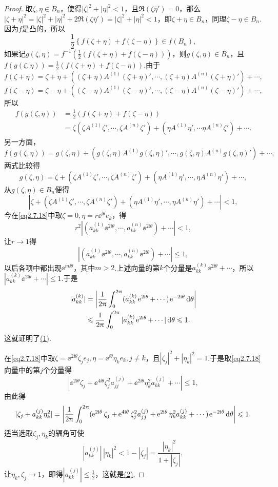 \begin{proof}
	取$\zeta,\eta\in B_n$，使得$|\zeta|^2+|\eta|^2<1$，且$\Re(\zeta\bar{\eta}')=0$，那么$|\zeta+\eta|^2=|\zeta|^2+|\eta|^2+2\Re(\zeta\bar{\eta}')=|\zeta|^2+|\eta|^2<1$，即$\zeta+\eta\in B_n$，同理$\zeta-\eta\in B_n$.因为$f$是凸的，所以
	\[\frac12\left\{f(\zeta+\eta)+f(\zeta-\eta)\right\}\in f(B_n),\]
	如果记$g(\zeta,\eta)=f^{-1}\left(\frac12\left(f(\zeta+\eta)+f(\zeta-\eta)\right)\right)$，则$g(\zeta,\eta)\in B_n$，且$f(g(\zeta,\eta))=\frac12\left(f(\zeta+\eta)+f(\zeta-\eta)\right)$.由于
	\[f(\zeta+\eta)=\zeta+\eta+((\zeta+\eta)A^{(1)}(\zeta+\eta)',\cdots,(\zeta+\eta)A^{(n)}(\zeta+\eta)')+\cdots,\]
	\[f(\zeta-\eta)=\zeta-\eta+((\zeta-\eta)A^{(1)}(\zeta-\eta)',\cdots,(\zeta-\eta)A^{(n)}(\zeta-\eta)')+\cdots,\]
	所以
	\begin{align*}
		f(g(\zeta,\eta))
		&=\frac12(f(\zeta+\eta)+f(\zeta-\eta))\\
		&=\zeta(\zeta A^{(1)}\zeta',\cdots,\zeta A^{(n)}\zeta')+(\eta A^{(1)}\eta',\cdots\eta A^{(n)}\zeta')+\cdots.
	\end{align*}
另一方面，
\[f(g(\zeta,\eta))=g(\zeta,\eta)+(g(\zeta,\eta)A^{(1)}g(\zeta,\eta)',\cdots,g(\zeta,\eta)A^{(n)}g(\zeta,\eta)')+\cdots,\]
两式比较得
\[g(\zeta,\eta)=\zeta+(\zeta A^{(1)}\zeta',\cdots,\zeta A^{(n)}\zeta')+(\eta A^{(1)}\eta',\cdots,\eta A^{(n)}\eta')+\cdots,\]
从$g(\zeta,\eta)\in B_n$便得
\begin{equation}\label{eq2.7.18}
	|\zeta+(\zeta A^{(1)}\zeta',\cdots,\zeta A^{(n)}\zeta')+(\eta A^{(1)}\eta',\cdots,\eta A^{(n)}\eta')+\cdots|<1,
\end{equation}
今在\eqref{eq2.7.18}中取$\zeta=0,\eta=r\ee^{\ii\theta}e_k$，得
\[r^2|(a_{kk}^{(1)}\ee^{2\ii\theta},\cdots,a_{kk}^{(n)}\ee^{2\ii\theta})+\cdots|<1,\]
让$r\to1$得
\[|(a_{kk}^{(1)}\ee^{2\ii\theta},\cdots,a_{kk}^{(n)}\ee^{2\ii\theta})+\cdots|\le1,\]
以后各项中都出现$\ee^{m\ii\theta}$，其中$m>2$.上述向量的第$k$个分量是$a_{kk}^{(k)}\ee^{2\ii\theta}+\cdots$，所以$|a_{kk}^{(k)}\ee^{2\ii\theta}+\cdots|\le1$.于是
\begin{align*}
	|a_{kk}^{(k)}|
	&=\left|\frac1{2\pi}\int_{0}^{2\pi}(a_{kk}^{(k)}\ee^{2\ii\theta}+\cdots)\ee^{-2\ii\theta}\dif\theta\right|\\
	&\le\frac1{2\pi}\int_{0}^{2\pi}|a_{kk}^{(k)}\ee^{2\ii\theta}+\cdots|\dif\theta\le1.
\end{align*}
这就证明了\hyperlink{2.7.4}{(1)}.

在\eqref{eq2.7.18}中取$\zeta=\ee^{2\ii\theta}\zeta_je_j,\eta=\ee^{\ii\theta}\eta_ke_k,j\neq k$，且$|\zeta_j|^2+|\eta_k|^2=1$.于是取\eqref{eq2.7.18}向量中的第$j$个分量得
\[|\ee^{2\ii\theta}\zeta_j+\ee^{4\ii\theta}\zeta_j^2a_{jj}^{(j)}+\ee^{2\ii\theta}\eta_k^2 a_{kk}^{(j)}+\cdots|\le1,\]
由此得
\[|\zeta_j+a_{kk}^{(j)}\eta_k^2|=\left|\frac1{2\pi}\int_{0}^{2\pi}(\ee^{2\ii\theta}\zeta_j+\ee^{4\ii\theta}\zeta_j^2 a_{jj}^{(j)}+\ee^{2\ii\theta}\eta_k^2a_{kk}^{(j)}+\cdots)\ee^{-2\ii\theta}\dif\theta\right|\le1.\]
适当选取$\zeta_j,\eta_k$的辐角可使
\[|a_{kk}^{(j)}|\, |\eta_k|^2<1-|\zeta_j|=\frac{|\eta_k|^2}{1+|\zeta_j|},\]
让$\eta_k,\zeta_j\to1$，即得$|a_{kk}^{(j)}|\le\frac12$，这就是\hyperlink{2.7.4}{(2)}.


\end{proof}
